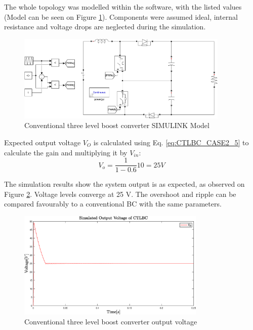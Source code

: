 The whole topology was modelled within the software, with the listed values (Model can be seen on Figure \ref{fig:Model_CTLBC}). Components were assumed ideal, internal resistance and voltage drops are neglected during the simulation. 

\begin{figure} [H]
   \centering
   \includegraphics[width=0.9\textwidth]{figures/dConventionalThreeLevelBC/Model_CTLBC.pdf}
    \caption{Conventional three level boost converter SIMULINK Model}
	\label{fig:Model_CTLBC}
\end{figure}

Expected output voltage $V_O$ is calculated using Eq. \ref{eq:CTLBC_CASE2_5} to calculate the gain and multiplying it by $V_{in}$: 
\begin{equation}
	{V_o}= \frac{1}{1-0.6}10=25V
	\label{eq:Simulation_CTLBC}
\end{equation}

The simulation results show the system output is as expected, as observed on Figure \ref {fig:Simulation_CTLBC}. Voltage levels converge at 25 V. The overshoot and ripple can be compared favourably to a conventional BC with the same parameters. 


\begin{figure} [H]
   \centering
   \includegraphics[width=0.8\textwidth]{figures/dConventionalThreeLevelBC/Simulation_CTLBC.eps}
    \caption{Conventional three level boost converter output voltage}
	\label{fig:Simulation_CTLBC}
\end{figure}